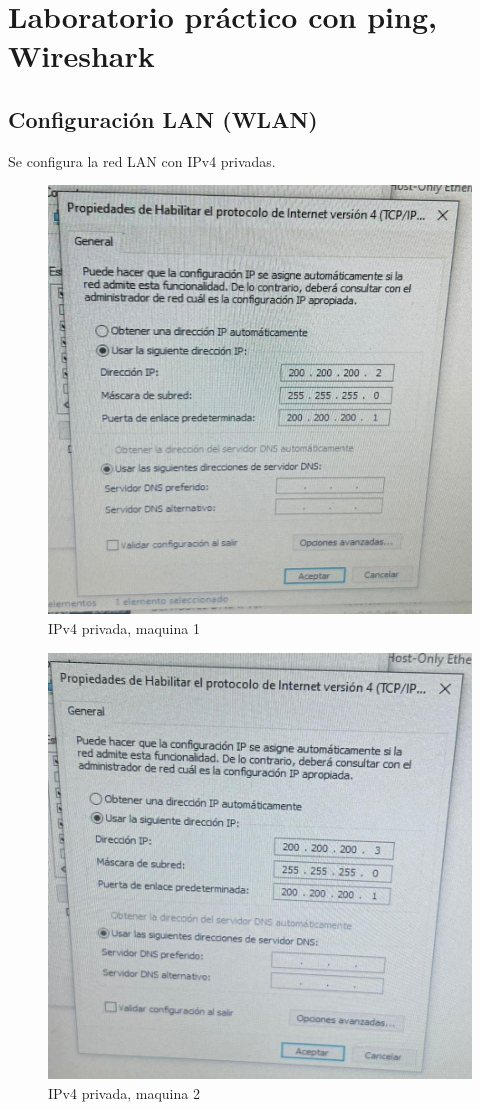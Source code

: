 \section{Laboratorio práctico con ping, Wireshark}
\subsection{Configuración LAN (WLAN)}
Se configura la red LAN con IPv4 privadas.
\begin{figure}[H]
    \centering
    \includegraphics[width=0.75\columnwidth]{punto1/p1_a.jpeg}
    \caption{IPv4 privada, maquina 1}
    \label{fig:ipv4_a}
\end{figure}

\begin{figure}[H]
    \centering
    \includegraphics[width=0.75\columnwidth]{punto1/p1_b.jpeg}
    \caption{IPv4 privada, maquina 2}
    \label{fig:ipv4_b}
\end{figure}

